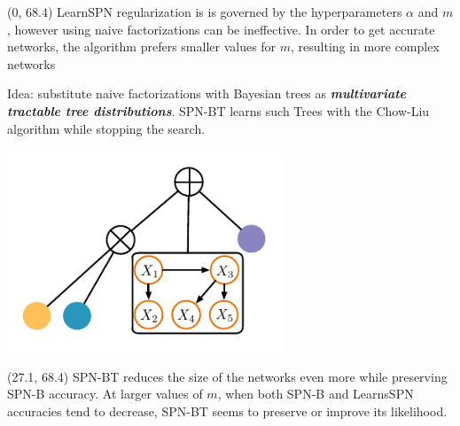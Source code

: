 \documentclass[final]{beamer}
\begin{document}
\begin{frame}{}
  \begin{textblock}{25.7}(0, 68.4)
    \footnotesize
    LearnSPN regularization is is governed by the hyperparameters $\alpha$ and $m$,
    however using naive factorizations can be ineffective. In order to
    get accurate networks, the algorithm prefers smaller values for
    $m$, resulting in more complex networks\par\bigskip

    Idea: substitute naive factorizations with Bayesian trees as
    \emph{\textbf{multivariate tractable tree
        distributions}}. \textsf{SPN-BT} learns such \textsf{T}rees
    with the Chow-Liu algorithm while stopping the search.\par\bigskip

    \hspace{40pt}\begin{minipage}[c]{0.3\linewidth}
      \hspace{-30pt}
        \includegraphics[width=8.2cm]{figures/spn-clt}
    \end{minipage}
    
  \end{textblock}
  
  \begin{textblock}{25.7}(27.1, 68.4)
    \footnotesize
    \textsf{SPN-BT} reduces the
    size of the networks even more while preserving \textsf{SPN-B}
    accuracy. At larger values of $m$, when both SPN-B and LearnsSPN
    accuracies tend to decrease, \textsf{SPN-BT} seems to preserve or
    improve its likelihood.
    

\end{textblock}
\end{frame}
\end{document}
